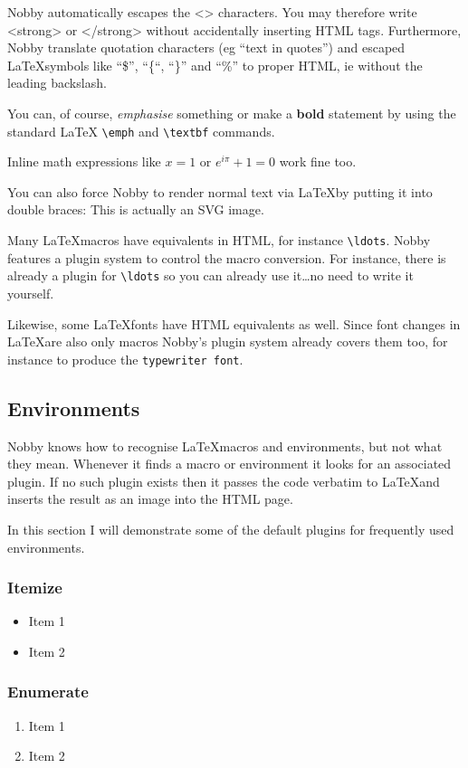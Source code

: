 \documentclass[10pt]{article}
\begin{document}
Nobby automatically escapes the <> characters. You may therefore
write <strong> or </strong> without accidentally inserting HTML tags.
Furthermore, Nobby translate quotation characters (eg ``text in quotes'') and
escaped \LaTeX symbols like ``\$'', ``\{``, ``\}'' and ``\%'' to proper HTML,
ie without the leading backslash.

You can, of course, \emph{emphasise} something or make a
\textbf{bold} statement by using the standard \LaTeX
\texttt{\textbackslash{emph}} and \texttt{\textbackslash{textbf}} commands.

Inline math expressions like $x=1$ or $e^{i\pi} + 1 = 0$ work fine too.

You can also force Nobby to render normal text via \LaTeX by putting it into
double braces: {{This is actually an SVG image.}}

Many \LaTeX macros have equivalents in HTML, for instance
\texttt{\textbackslash{ldots}}. Nobby features a plugin system to
control the macro conversion. For instance, there is already a plugin for
\texttt{\textbackslash{ldots}} so you can already use it\ldots no need to write
it yourself.

Likewise, some \LaTeX fonts have HTML equivalents as well. Since font changes
in \LaTeX are also only macros Nobby's plugin system already covers them too,
for instance to produce the \texttt{typewriter font}.

\subsection{Environments}
Nobby knows how to recognise \LaTeX macros and environments, but not what they
mean. Whenever it finds a macro or environment it looks for an associated
plugin. If no such plugin exists then it passes the code verbatim to \LaTeX and
inserts the result as an image into the HTML page.

In this section I will demonstrate some of the default plugins for frequently
used environments.

\subsubsection{Itemize}
\begin{itemize}
\item Item 1
\item Item 2
\end{itemize}

\subsubsection{Enumerate}
\begin{enumerate}
\item Item 1
\item Item 2
\end{enumerate}
\end{document}
